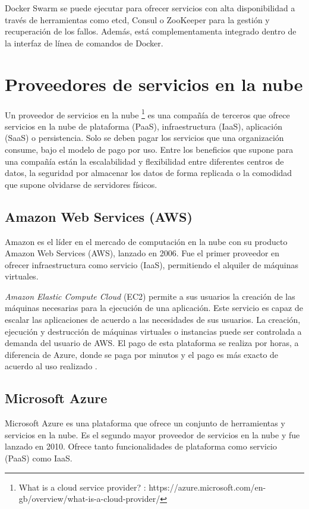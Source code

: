 \documentclass[11pt,spanish,listoffigures]{tfgetsinf}
\begin{document}
Docker Swarm se puede ejecutar para ofrecer servicios con alta disponibilidad a través de herramientas como etcd, Consul o ZooKeeper para la gestión y recuperación de los fallos. Además, está complementamenta integrado dentro de la interfaz de línea de comandos de Docker.

\section{Proveedores de servicios en la nube}

Un proveedor de servicios en la nube \footnote{ What is a cloud service provider?
: https://azure.microsoft.com/en-gb/overview/what-is-a-cloud-provider/} es una compañía de terceros que ofrece servicios en la nube de plataforma (PaaS), infraestructura (IaaS), aplicación (SaaS) o persistencia. Solo se deben pagar los servicios que una organización consume, bajo el modelo de pago por uso. Entre los beneficios que supone para una compañía están la escalabilidad y flexibilidad entre diferentes centros de datos, la seguridad por almacenar los datos de forma replicada o la comodidad que supone olvidarse de servidores físicos.

\subsection{Amazon Web Services (AWS)}
Amazon es el líder en el mercado de computación en la nube con su producto Amazon Web Services (AWS), lanzado en 2006. Fue el primer proveedor en ofrecer infraestructura como servicio (IaaS), permitiendo el alquiler de máquinas virtuales.

\textit{Amazon Elastic Compute Cloud} (EC2) permite a sus usuarios la creación de las máquinas necesarias para la ejecución de una aplicación. Este servicio es capaz de escalar las aplicaciones de acuerdo a las necesidades de sus usuarios. La creación, ejecución y destrucción de máquinas virtuales o instancias puede ser controlada a demanda del usuario de AWS. El pago de esta plataforma se realiza por horas, a diferencia de Azure, donde se paga por minutos y el pago es más exacto de acuerdo al uso realizado \cite{Qaisi2016}.

\subsection{Microsoft Azure}

Microsoft Azure \cite{Qaisi2016} es una plataforma que ofrece un conjunto de herramientas y servicios en la nube. Es el segundo mayor proveedor de servicios en la nube y fue lanzado en 2010. Ofrece tanto funcionalidades de plataforma como servicio (PaaS) como IaaS.
\end{document}

